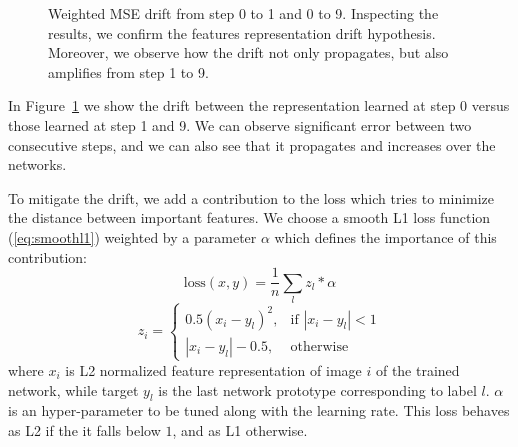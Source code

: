 \documentclass[10pt,twocolumn,letterpaper]{article}
\begin{document}
\begin{figure}
\begin{center}
\end{center}
\caption{Weighted MSE drift from step 0 to 1 and 0 to 9. Inspecting the results, we confirm the features representation drift hypothesis. Moreover, we observe how the drift not only propagates, but also amplifies from step 1 to 9.}
\label{5:histogram}
\end{figure}

In Figure~\ref{5:histogram} we show the drift between the representation learned at step 0 versus those learned at step 1 and 9. We can observe significant error between two consecutive steps, and we can also see that it propagates and increases over the networks.

To mitigate the drift, we add a contribution to the loss which tries to minimize the distance between important features. We choose a smooth L1 loss function (\ref{eq:smoothl1}) weighted by a parameter $\alpha$ which defines the importance of this contribution:
\begin{equation}
\text{loss}(x, y) = \frac{1}{n} \sum_{l} z_{l}*\alpha \label{eq:smoothl1}
\end{equation}
\[
    z_{i} =
    \begin{cases}
    0.5 (x_i - y_l)^2, & \text{if } |x_i - y_l| < 1 \\
    |x_i - y_l| - 0.5, & \text{otherwise }
    \end{cases}
\]
where $x_{i}$ is L2 normalized feature representation of image $i$ of the trained network, while target $y_{l}$ is the last network prototype corresponding to label $l$. $\alpha$ is an hyper-parameter to be tuned along with the learning rate.
This loss behaves as L2 if the it falls below $1$, and as L1 otherwise.
\end{document}

